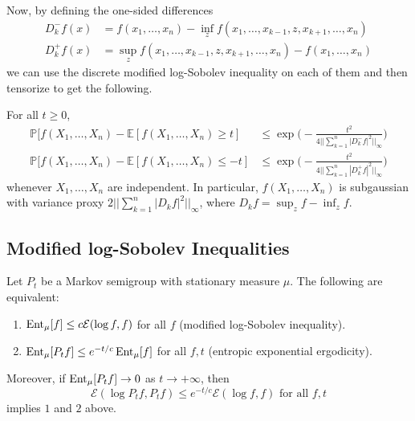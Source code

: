   Now, by defining the one-sided differences 
  \begin{align*}
      D_k^- f (x) & = f(x_1, \ldots, x_n) - \inf_z f (x_1, \ldots, x_{k-1}, z, x_{k+1}, \ldots, x_n) \\
      D_k^+ f (x) & = \sup_z f (x_1, \ldots, x_{k-1}, z, x_{k+1}, \ldots, x_n) - f(x_1, \ldots, x_n) 
  \end{align*}
  we can use the discrete modified log-Sobolev inequality on each of them and then tensorize to get the following. 

  \begin{theorem}
  For all $t \geq 0$, 
  \begin{align*}
      \mathbb{P}[ f(X_1, \ldots, X_n) - \mathbb{E}[f(X_1, \ldots, X_n) \geq t] & \leq \exp \bigg( -\frac{t^2}{4 || \sum_{k=1}^n |D_k^- f|^2||_\infty} \bigg) \\
      \mathbb{P}[ f(X_1, \ldots, X_n) - \mathbb{E}[f(X_1, \ldots, X_n) \leq -t] & \leq \exp \bigg( -\frac{t^2}{4 || \sum_{k=1}^n |D_k^+ f|^2||_\infty} \bigg) 
  \end{align*}
  whenever $X_1, \ldots, X_n$ are independent. In particular, $f(X_1, \ldots, X_n)$ is subgaussian with variance proxy $2 ||\sum_{k=1}^n |D_k f|^2 ||_\infty$, where $D_k f = \sup_z f - \inf_z f$. 
  \end{theorem}

\subsection{Modified log-Sobolev Inequalities}

  \begin{theorem}
  Let $P_t$ be a Markov semigroup with stationary measure $\mu$. The following are equivalent: 
  \begin{enumerate}
      \item $\Ent_\mu [f] \leq c \mathcal{E}(\log f, f)$ for all $f$ (modified log-Sobolev inequality). 
      \item $\Ent_\mu [P_t f] \leq e^{-t/c} \Ent_\mu [f]$ for all $f, t$ (entropic exponential ergodicity). 
  \end{enumerate}
  Moreover, if $\Ent_\mu [P_t f] \rightarrow 0$ as $t \rightarrow +\infty$, then 
  \[\mathcal{E}(\log P_t f, P_t f) \leq e^{-t/c} \mathcal{E}(\log f, f) \text{ for all } f, t\]
  implies $1$ and $2$ above. 
  \end{theorem}

